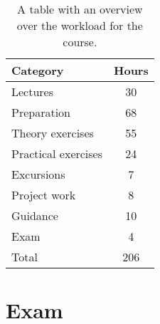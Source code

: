 \begin{table}[h]
    \centering
    \caption{A table with an overview over the workload for the course.}
    \label{tab:workload}
    \begin{tabular}{ l | c}
        \textbf{Category} & \textbf{Hours} \\ 
        \hline
        Lectures & 30 \\ 

        Preparation & 68 \\

        Theory exercises & 55 \\ 

        Practical exercises & 24 \\

        Excursions & 7 \\

        Project work & 8 \\

        Guidance & 10 \\ 
        Exam & 4 \\
        \hline
        Total & 206 \\ 
    \end{tabular}
\end{table}

\section*{Exam}

